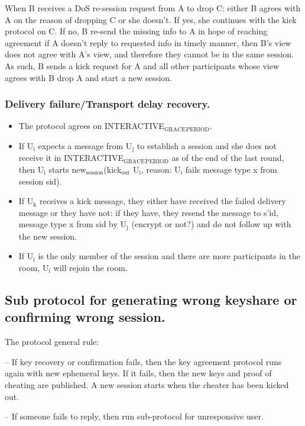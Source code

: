 \documentclass[11pt]{article}
\begin{document}
When B receives a DoS re-session request from A to drop C: either B agrees with A on the reason of dropping C or she doesn't. If yes, she continues with the kick protocol on C. If no, B re-send the missing info to A in hope of reaching agreement if A doesn't reply to requested info in timely manner, then B's view does not agree with A's view, and therefore they cannot be in the same session. As such, B sends a kick request for A and all other participants whose view agrees with B drop A and start a new session.

\subsubsection{Delivery failure/Transport delay recovery.}
\label{sec-8-1-1}
\begin{itemize}
\item The protocol agrees on INTERACTIVE$_{\text{GRACE}}$$_{\text{PERIOD}}$.
\item If U$_{\text{i}}$ expects a message from U$_{\text{j}}$ to establish a session and she does not receive it in INTERACTIVE$_{\text{GRACE}}$$_{\text{PERIOD}}$ as of the end of the last round, then U$_{\text{i}}$ starts new$_{\text{session}}$(kick$_{\text{out}}$ U$_{\text{i}}$, reason: U$_{\text{i}}$ fails message type x from session sid).
\item If U$_{\text{k}}$ receives a kick message, they either have received the failed delivery message or they have not: if they have, they resend the message to s'id, message type x from sid by U$_{\text{j}}$ (encrypt or not?) and do not follow up with the new
session.
\item If U$_{\text{i}}$ is the only member of the session and there are more participants in the room, U$_{\text{i}}$ will rejoin the room.
\end{itemize}

\subsection{Sub protocol for generating wrong keyshare or confirming wrong session.}
\label{sec-8-2}

The protocol general rule:

-- If key recovery or confirmation fails, then the key agreement protocol runs again with new ephemeral keys. If it fails, then the new keys and proof of cheating are published. A new session starts when the cheater has been kicked out.

-- If someone fails to reply, then run sub-protocol for unresponsive user.
\end{document}
